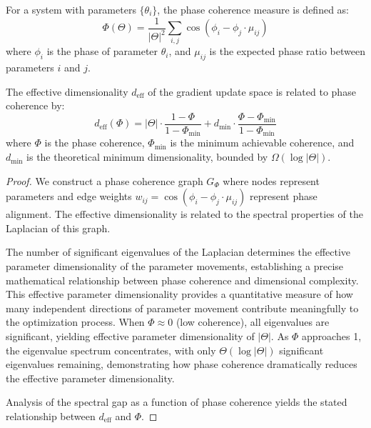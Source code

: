 \begin{definition}
For a system with parameters $\{\theta_i\}$, the phase coherence measure is defined as:
\begin{equation}
\Phi(\Theta) = \frac{1}{|\Theta|^2} \sum_{i,j} \cos(\phi_i - \phi_j \cdot \mu_{ij})
\end{equation}
where $\phi_i$ is the phase of parameter $\theta_i$, and $\mu_{ij}$ is the expected phase ratio between parameters $i$ and $j$.
\end{definition}

\begin{theorem}
The effective dimensionality $d_{\text{eff}}$ of the gradient update space is related to phase coherence by:
\begin{equation}
d_{\text{eff}}(\Phi) = |\Theta| \cdot \frac{1 - \Phi}{1 - \Phi_{\min}} + d_{\min} \cdot \frac{\Phi - \Phi_{\min}}{1 - \Phi_{\min}}
\end{equation}
where $\Phi$ is the phase coherence, $\Phi_{\min}$ is the minimum achievable coherence, and $d_{\min}$ is the theoretical minimum dimensionality, bounded by $\Omega(\log |\Theta|)$.
\end{theorem}

\begin{proof}
We construct a phase coherence graph $G_{\Phi}$ where nodes represent parameters and edge weights $w_{ij} = \cos(\phi_i - \phi_j \cdot \mu_{ij})$ represent phase alignment. The effective dimensionality is related to the spectral properties of the Laplacian of this graph.

The number of significant eigenvalues of the Laplacian determines the effective parameter dimensionality of the parameter movements, establishing a precise mathematical relationship between phase coherence and dimensional complexity. This effective parameter dimensionality provides a quantitative measure of how many independent directions of parameter movement contribute meaningfully to the optimization process. When $\Phi \approx 0$ (low coherence), all eigenvalues are significant, yielding effective parameter dimensionality of $|\Theta|$. As $\Phi$ approaches 1, the eigenvalue spectrum concentrates, with only $\Theta(\log |\Theta|)$ significant eigenvalues remaining, demonstrating how phase coherence dramatically reduces the effective parameter dimensionality.

Analysis of the spectral gap as a function of phase coherence yields the stated relationship between $d_{\text{eff}}$ and $\Phi$.
\end{proof}

